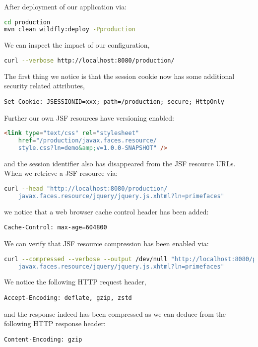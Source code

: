 After deployment of our application via:
\begin{lstlisting}[language=bash]
cd production
mvn clean wildfly:deploy -Pproduction
\end{lstlisting}
We can inspect the impact of our configuration,
\begin{lstlisting}[language=bash]
curl --verbose http://localhost:8080/production/
\end{lstlisting}
The first thing we notice is that the session cookie now has some additional security related attributes,
\begin{lstlisting}
Set-Cookie: JSESSIONID=xxx; path=/production; secure; HttpOnly
\end{lstlisting}
Further our own JSF resources have versioning enabled:
\begin{lstlisting}[language=html]
<link type="text/css" rel="stylesheet"
	href="/production/javax.faces.resource/
	style.css?ln=demo&amp;v=1.0.0-SNAPSHOT" />
\end{lstlisting}
and the session identifier also has disappeared from the JSF resource URLs.
When we retrieve a JSF resource via:
\begin{lstlisting}[language=bash]
curl --head "http://localhost:8080/production/
	javax.faces.resource/jquery/jquery.js.xhtml?ln=primefaces"
\end{lstlisting}
we notice that a web browser cache control header has been added:
\begin{lstlisting}
Cache-Control: max-age=604800
\end{lstlisting}
We can verify that JSF resource compression has been enabled via:
\begin{lstlisting}[language=bash]
curl --compressed --verbose --output /dev/null "http://localhost:8080/production/
	javax.faces.resource/jquery/jquery.js.xhtml?ln=primefaces"
\end{lstlisting}
We notice the following HTTP request header,
\begin{lstlisting}
Accept-Encoding: deflate, gzip, zstd
\end{lstlisting}
and the response indeed has been compressed as we can deduce from the following HTTP response header:
\begin{lstlisting}
Content-Encoding: gzip
\end{lstlisting}

